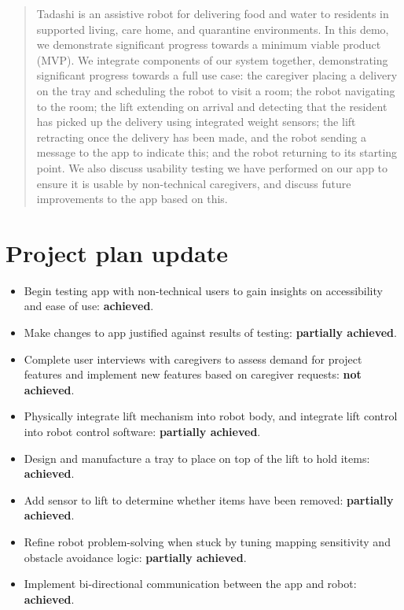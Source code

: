 \documentclass{article}
\begin{document}
 



\begin{abstract}
  Tadashi is an assistive robot for delivering food and water to residents in supported living, care home, and quarantine environments.
  In this demo, we demonstrate significant progress towards a minimum viable product (MVP). We integrate components of our system together, demonstrating significant progress towards a full use case: the caregiver placing a delivery on the tray and scheduling the robot to visit a room; the robot navigating to the room; the lift extending on arrival and detecting that the resident has picked up the delivery using integrated weight sensors; the lift retracting once the delivery has been made, and the robot sending a message to the app to indicate this; and the robot returning to its starting point. We also discuss usability testing we have performed on our app to ensure it is usable by non-technical caregivers, and discuss future improvements to the app based on this. 
\end{abstract} 

\section{Project plan update} 
\begin{itemize}
\item Begin testing app with non-technical users to gain insights on accessibility and ease of use: {\bf achieved}.
\item Make changes to app justified against results of testing: {\bf partially achieved}.
\item Complete user interviews with caregivers to assess demand for project features and implement new features based on caregiver requests: {\bf not achieved}.
\item Physically integrate lift mechanism into robot body, and integrate lift control into robot control software: {\bf partially achieved}.
\item Design and manufacture a tray to place on top of the lift to hold items: {\bf achieved}.
\item Add sensor to lift to determine whether items have been removed: {\bf partially achieved}.
\item Refine robot problem-solving when stuck by tuning mapping sensitivity and obstacle avoidance logic: {\bf partially achieved}. 
\item Implement bi-directional communication between the app and robot: {\bf achieved}.
\end{itemize}
\end{document}
